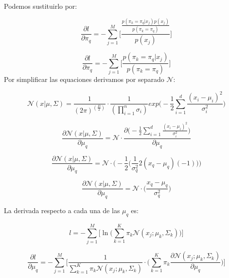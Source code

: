 \documentclass[a5paper]{article}
\begin{document}
\begin{enumerate}
Podemos sustituirlo por:

\begin{equation*}
\frac{\partial l}{\partial \pi_q} = 
-\sum_{j = 1}^{M} \Bigg[ 
\frac
{
    \frac
    {
        p(\pi_k = \pi_q|x_j)p(x_j)
    }
    {
        p(\pi_k = \pi_q)
    }
}
{
p(x_j)
}
\Bigg] 
\end{equation*}


\begin{equation*}
\frac{\partial l}{\partial \pi_q} = 
-\sum_{j = 1}^{M} \Bigg[ 
    \frac
    {
        p(\pi_k = \pi_q|x_j)
    }
    {
        p(\pi_k = \pi_q)
    }
\Bigg] 
\end{equation*}
Por simplificar las equaciones derivamos por separado $\mathcal{N}$:

\begin{equation*}
\mathcal{N}(x|\mu,\Sigma) = \frac{1}{(2\pi)^{(\frac{D}{2})}} \cdot \frac{1}{(\prod_{i = 1}^n \sigma_i)} exp\Bigg( -\frac{1}{2} \sum_{i = 1}^{d} \frac{(x_i - \mu_i)^2}{\sigma_i^2} \Bigg)
\end{equation*}


\begin{equation*}
\frac{\partial \mathcal{N}(x|\mu, \Sigma)}{\partial \mu_q} = \mathcal{N}
\cdot \frac
{\partial \Big(
-\frac{1}{2} \sum_{i = 1}^{d} \frac{(x_i - \mu_i)^2}{\sigma_i^2}
\Big)}
{\partial \mu_q}
\end{equation*}

\begin{equation*}
\frac{\partial \mathcal{N}(x|\mu, \Sigma)}{\partial \mu_q} = \mathcal{N}
\cdot
\Big(
-\frac{1}{2}
    \big(
        \frac{1}{\sigma_q^2}
        2(x_q - \mu_q)
        (-1)
    \big)
\Big)
\end{equation*}


\begin{equation*}
\frac{\partial \mathcal{N}(x|\mu, \Sigma)}{\partial \mu_q} =
\mathcal{N}
\cdot
\Big(
        \frac{x_q - \mu_q}{\sigma_q^2}
\Big)
\end{equation*}



La derivada respecto a cada una de las $\mu_q$ es:

\begin{equation*}
l = -\sum_{j = 1}^{M} \Bigg[ 
\ln\Big(
\sum_{k = 1}^{K} \pi_k \mathcal{N}(x_j; \mu_k, \Sigma_k)
\Big)
\Bigg] 
\end{equation*}

\begin{equation*}
\frac{\partial l}{\partial \mu_q} =
-\sum_{j = 1}^{M} \Bigg[
\frac{1}
{
\sum_{k = 1}^{K} \pi_k \mathcal{N}(x_j; \mu_k, \Sigma_k)
}
\cdot
\Big(
    \sum_{k = 1}^{K} \pi_k
    \frac{\partial \mathcal{N}(x_j; \mu_k, \Sigma_k)}{\partial \mu_q}
\Big)
\Bigg]
\end{equation*}



\end{enumerate}
\end{document}
